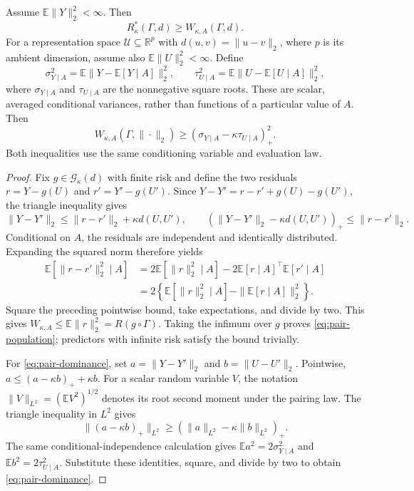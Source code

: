 \begin{theorem}
\label{thm:pair-obstruction}
Assume $\mathbb E\|Y\|_2^2<\infty$. Then
\begin{equation}
 R^*_\kappa(\Gamma,d)\geq W_{\kappa,A}(\Gamma,d).
 \label{eq:pair-population}
\end{equation}
For a representation space $\mathcal U\subseteq\mathbb R^p$ with
$d(u,v)=\|u-v\|_2$, where $p$ is its ambient dimension, assume also
$\mathbb E\|U\|_2^2<\infty$. Define
\[
 \sigma_{Y\mid A}^2=\mathbb E\|Y-\mathbb E[Y\mid A]\|_2^2,
 \qquad
 \tau_{U\mid A}^2=\mathbb E\|U-\mathbb E[U\mid A]\|_2^2,
\]
where $\sigma_{Y\mid A}$ and $\tau_{U\mid A}$ are the nonnegative square
roots. These are scalar, averaged conditional variances, rather than
functions of a particular value of $A$. Then
\begin{equation}
 W_{\kappa,A}(\Gamma,\|\cdot\|_2)
 \geq (\sigma_{Y\mid A}-\kappa\tau_{U\mid A})_+^2.
 \label{eq:pair-dominance}
\end{equation}
Both inequalities use the same conditioning variable and evaluation law.
\end{theorem}

\begin{proof}
Fix $g\in\mathcal G_\kappa(d)$ with finite risk and define the two residuals
$r=Y-g(U)$ and $r'=Y'-g(U')$. Since
$Y-Y'=r-r'+g(U)-g(U')$, the triangle inequality gives
\[
 \|Y-Y'\|_2\leq\|r-r'\|_2+\kappa d(U,U'),
 \qquad
 (\|Y-Y'\|_2-\kappa d(U,U'))_+\leq\|r-r'\|_2.
\]
Conditional on $A$, the residuals are independent and identically
distributed. Expanding the squared norm therefore yields
\begin{align*}
 \mathbb E[\|r-r'\|_2^2\mid A]
 &=2\mathbb E[\|r\|_2^2\mid A]
           -2\mathbb E[r\mid A]^\top\mathbb E[r'\mid A]\\
 &=2\left\{\mathbb E[\|r\|_2^2\mid A]
                    -\|\mathbb E[r\mid A]\|_2^2\right\}.
\end{align*}
Square the preceding pointwise bound, take expectations, and divide by two.
This gives $W_{\kappa,A}\leq\mathbb E\|r\|_2^2=R(g\circ\Gamma)$.
Taking the infimum over $g$ proves \eqref{eq:pair-population}; predictors
with infinite risk satisfy the bound trivially.

For \eqref{eq:pair-dominance}, set
$a=\|Y-Y'\|_2$ and $b=\|U-U'\|_2$. Pointwise,
$a\leq(a-\kappa b)_++\kappa b$. For a scalar random variable $V$, the
notation $\|V\|_{L^2}=(\mathbb E V^2)^{1/2}$ denotes its root second
moment under the pairing law. The triangle inequality in $L^2$ gives
\[
 \|(a-\kappa b)_+\|_{L^2}
 \geq(\|a\|_{L^2}-\kappa\|b\|_{L^2})_+.
\]
The same conditional-independence calculation gives
$\mathbb E a^2=2\sigma_{Y\mid A}^2$ and
$\mathbb E b^2=2\tau_{U\mid A}^2$. Substitute these identities, square,
and divide by two to obtain \eqref{eq:pair-dominance}.
\end{proof}

